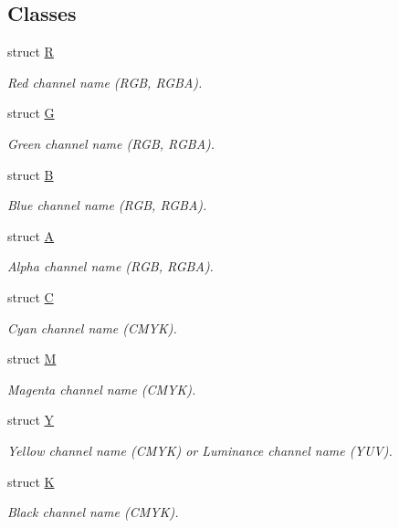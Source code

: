 \subsection*{Classes}
\begin{DoxyCompactItemize}
\item 
struct \hyperlink{struct_d_o_1_1_r}{R}
\begin{DoxyCompactList}\small\item\em Red channel name (R\-G\-B, R\-G\-B\-A). \end{DoxyCompactList}\item 
struct \hyperlink{struct_d_o_1_1_g}{G}
\begin{DoxyCompactList}\small\item\em Green channel name (R\-G\-B, R\-G\-B\-A). \end{DoxyCompactList}\item 
struct \hyperlink{struct_d_o_1_1_b}{B}
\begin{DoxyCompactList}\small\item\em Blue channel name (R\-G\-B, R\-G\-B\-A). \end{DoxyCompactList}\item 
struct \hyperlink{struct_d_o_1_1_a}{A}
\begin{DoxyCompactList}\small\item\em Alpha channel name (R\-G\-B, R\-G\-B\-A). \end{DoxyCompactList}\item 
struct \hyperlink{struct_d_o_1_1_c}{C}
\begin{DoxyCompactList}\small\item\em Cyan channel name (C\-M\-Y\-K). \end{DoxyCompactList}\item 
struct \hyperlink{struct_d_o_1_1_m}{M}
\begin{DoxyCompactList}\small\item\em Magenta channel name (C\-M\-Y\-K). \end{DoxyCompactList}\item 
struct \hyperlink{struct_d_o_1_1_y}{Y}
\begin{DoxyCompactList}\small\item\em Yellow channel name (C\-M\-Y\-K) or Luminance channel name (Y\-U\-V). \end{DoxyCompactList}\item 
struct \hyperlink{struct_d_o_1_1_k}{K}
\begin{DoxyCompactList}\small\item\em Black channel name (C\-M\-Y\-K). \end{DoxyCompactList}\item 

\end{DoxyCompactItemize}

